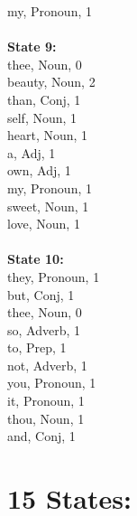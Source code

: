 \begin{multicols}{4}
my, Pronoun, 1\\
\\
\noindent\textbf{State 9:} \\
thee, Noun, 0\\
beauty, Noun, 2\\
than, Conj, 1\\
self, Noun, 1\\
heart, Noun, 1\\
a, Adj, 1\\
own, Adj, 1\\
my, Pronoun, 1\\
sweet, Noun, 1\\
love, Noun, 1\\
\\
\noindent\textbf{State 10:} \\
they, Pronoun, 1\\
but, Conj, 1\\
thee, Noun, 0\\
so, Adverb, 1\\
to, Prep, 1\\
not, Adverb, 1\\
you, Pronoun, 1\\
it, Pronoun, 1\\
thou, Noun, 1\\
and, Conj, 1

\section{\textbf{15 States:}}


\end{multicols}
